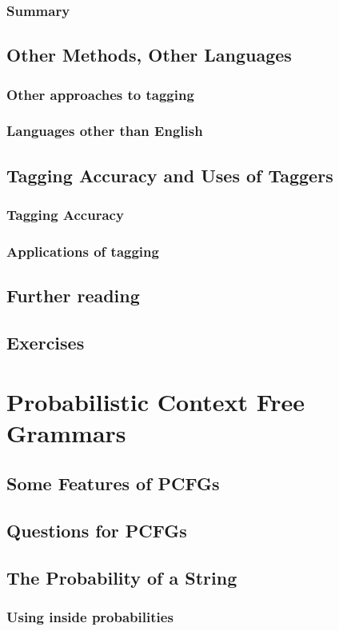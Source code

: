\documentclass[a4paper]{article}
\begin{document}
\subsubsection{Summary}
\subsection{Other Methods, Other Languages}
\subsubsection{Other approaches to tagging}
\subsubsection{Languages other than English}
\subsection{Tagging Accuracy and Uses of Taggers}
\subsubsection{Tagging Accuracy}
\subsubsection{Applications of tagging}
\subsection{Further reading}
\subsection{Exercises}
\newpage
\section{Probabilistic Context Free Grammars}
\subsection{Some Features of PCFGs}
\subsection{Questions for PCFGs}
\subsection{The Probability of a String}
\subsubsection{Using inside probabilities}
\end{document}
